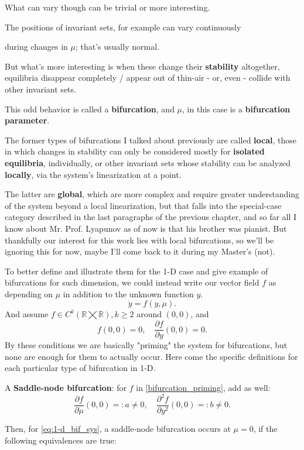 What can vary though can be trivial or more interesting.

The positions of invariant sets, for example can vary continuously

during changes in $\mu$; that's usually normal.

But what's more interesting is when these change their \textbf{stability} altogether, equilibria disappear completely / appear out of thin-air - or, even - collide with other invariant sets.

This odd behavior is called a \textbf{bifurcation}, and $\mu$, in this case is a \textbf{bifurcation parameter}.

The former types of bifurcations I talked about previously are called \textbf{local}, those in which changes in stability can only be considered mostly for \textbf{isolated equilibria}, individually, or other invariant sets whose stability can be analyzed \textbf{locally}, via the system's linearization at a point.

The latter are \textbf{global}, which are more complex and require greater understanding of the system beyond a local linearization, but that falls into the special-case category described in the last paragraphs of the previous chapter, and so far all I know about Mr. Prof. Lyapunov as of now is that his brother was pianist. But thankfully our interest for this work lies with local bifurcations, so we'll be ignoring this for now, maybe I'll come back to it during my Master's (not).

To better define and illustrate them for the 1-D case and give example of bifurcations for such dimension, we could instead write our vector field $f$ as depending on $\mu$ in addition to the unknown function $y$.
\begin{equation}\label{eq:1-d_bif_sys}
	\dot{y} = f(y, \mu).
\end{equation}
And assume $f \in C^k(\mathbb{R} \bigtimes \mathbb{R}), k \geq 2 $ around $(0,0)$, and
\begin{equation}\label{bifurcation_priming}
	f(0,0) = 0, \quad \frac{\partial f}{\partial y}(0,0) = 0.
\end{equation}
By these conditions we are basically "priming" the system for bifurcations, but none are enough for them to actually occur. Here come the specific definitions for each particular type of bifurcation in 1-D.

\begin{definition}
	A \textbf{Saddle-node bifurcation}:
	for $f$ in \ref{bifurcation_priming}, add as well:
	\begin{equation*}
		\frac{\partial f}{\partial \mu}(0,0) =: a \neq 0, \quad \frac{\partial^2 f}{\partial y^2}(0,0) =:b \neq 0.
	\end{equation*}
\end{definition}
Then, for \ref{eq:1-d_bif_sys}, a saddle-node bifurcation occurs at $\mu = 0$, if the following equivalences are true:


